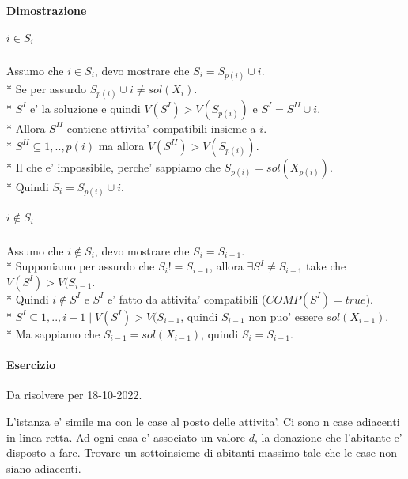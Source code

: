 \paragraph{Dimostrazione}

\subparagraph{$i \in S_i$}
Assumo che $i \in S_i$, devo mostrare che $S_i = S_{p(i)} \cup {i}$. \\*
Se per assurdo $S_{p(i)} \cup {i} \ne sol(X_i)$. \\*
$S^I$ e' la soluzione e quindi $V(S^I) > V(S_{p(i)})$ e $S^I = S^{II} \cup {i}$. \\*
Allora $S^{II}$ contiene attivita' compatibili insieme a $i$. \\*
$S^{II} \subseteq {1,..,p(i)}$ ma allora $V(S^{II}) > V(S_{p(i)})$. \\*
Il che e' impossibile, perche' sappiamo che $S_{p(i)} = sol(X_{p(i)})$. \\*
Quindi $S_i = S_{p(i)} \cup {i}$.

\subparagraph{$i \notin S_i$}

Assumo che $i \notin S_i$, devo mostrare che $S_i = S_{i-1}$. \\*
Supponiamo per assurdo che $S_i != S_{i-1}$, allora $\exists S^I \ne S_{i-1}$ take che $V(S^I) > V(S_{i-1}$. \\*
Quindi $i \notin S^I$ e $S^I$ e' fatto da attivita' compatibili ($COMP(S^I) = true$). \\*
$S^I \subseteq {1,..,i-1} \mid V(S^I) > V(S_{i-1}$, quindi $S_{i-1}$ non puo' essere $sol(X_{i-1})$. \\*
Ma sappiamo che $S_{i-1} = sol(X_{i-1})$, quindi $S_i = S_{i-1}$.

\paragraph{Esercizio}
Da risolvere per 18-10-2022.

L'istanza e' simile ma con le case al posto delle attivita'.
Ci sono n case adiacenti in linea retta.
Ad ogni casa e' associato un valore $d$, la donazione che l'abitante e' disposto a fare.
Trovare un sottoinsieme di abitanti massimo tale che le case non siano adiacenti.
